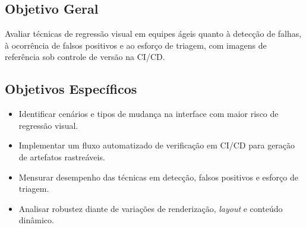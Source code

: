 \documentclass{UNESC}
\begin{document}
\subsection{Objetivo Geral}
{
Avaliar técnicas de regressão visual em equipes ágeis quanto à detecção de falhas, à ocorrência de falsos positivos e ao esforço de triagem, com imagens de referência sob controle de versão na CI/CD.
}

\subsection{Objetivos Específicos}
{
\begin{itemize}[leftmargin=2em]
    \item Identificar cenários e tipos de mudança na interface com maior risco de regressão visual.
    \item Implementar um fluxo automatizado de verificação em CI/CD para geração de artefatos rastreáveis.
    \item Mensurar desempenho das técnicas em detecção, falsos positivos e esforço de triagem.
    \item Analisar robustez diante de variações de renderização, \emph{layout} e conteúdo dinâmico.
\end{itemize}
}
\end{document}

